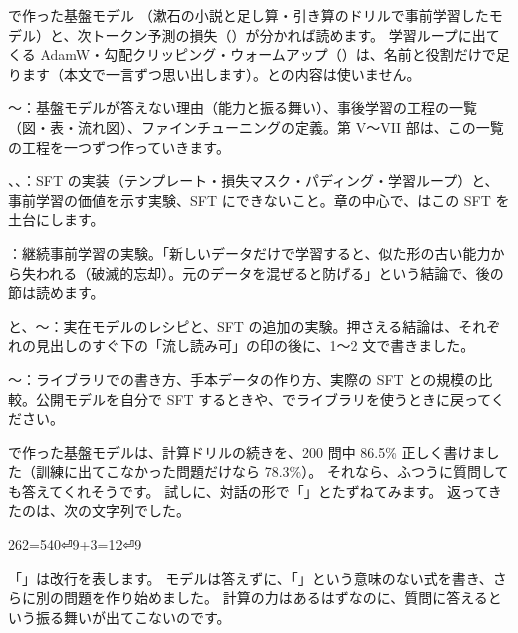 \begin{readingguide}
\item[\rgpre] で作った基盤モデル （漱石の小説と足し算・引き算のドリルで事前学習したモデル）と、次トークン予測の損失（）が分かれば読めます。
学習ループに出てくる AdamW・勾配クリッピング・ウォームアップ（）は、名前と役割だけで足ります（本文で一言ずつ思い出します）。との内容は使いません。
\item[\rgmust] 〜：基盤モデルが答えない理由（能力と振る舞い）、事後学習の工程の一覧（図・表・流れ図）、ファインチューニングの定義。第 V〜VII 部は、この一覧の工程を一つずつ作っていきます。
\item[\rgmust] 、、：SFT の実装（テンプレート・損失マスク・パディング・学習ループ）と、事前学習の価値を示す実験、SFT にできないこと。章の中心で、はこの SFT を土台にします。
\item[\rgskim] ：継続事前学習の実験。「新しいデータだけで学習すると、似た形の古い能力から失われる（破滅的忘却）。元のデータを混ぜると防げる」という結論で、後の節は読めます。
\item[\rgskim] と、〜：実在モデルのレシピと、SFT の追加の実験。押さえる結論は、それぞれの見出しのすぐ下の「流し読み可」の印の後に、1〜2 文で書きました。
\item[\rglater] 〜：ライブラリでの書き方、手本データの作り方、実際の SFT との規模の比較。公開モデルを自分で SFT するときや、でライブラリを使うときに戻ってください。
\end{readingguide}

で作った基盤モデルは、計算ドリルの続きを、200 問中 86.5\% 正しく書けました（訓練に出てこなかった問題だけなら 78.3\%）。
それなら、ふつうに質問しても答えてくれそうです。
試しに、対話の形で「」とたずねてみます。
返ってきたのは、次の文字列でした。

\begin{textcode}
262=540⏎9+3=12⏎9
\end{textcode}

「」は改行を表します。
モデルは答えずに、「」という意味のない式を書き、さらに別の問題を作り始めました。
計算の力はあるはずなのに、質問に答えるという振る舞いが出てこないのです。

